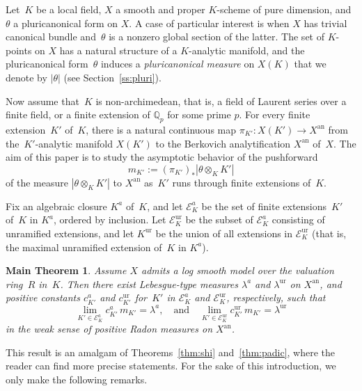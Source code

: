 \documentclass[JEP,XML,SOM,Unicode,NoFloatCountersInSection]{cedram}
\let\mathcal\mathscr
\newtheorem*{theorem*}{Main Theorem}
\theoremstyle{definition}
\numberwithin{equation}{subsection}
\newcommand{\Q}{\ensuremath{\mathbb{Q}}}
\newcommand{\an}{\mathrm{an}}
\newcommand{\ur}{\mathrm{ur}}
\let\form\theta
\let\Leb\lambda
\begin{document}
Let~$K$ be a local field, $X$ a smooth and proper $K$\nobreakdash-scheme of pure dimension, and~$\form$ a pluricanonical form on $X$. A case of particular interest is when $X$ has trivial canonical bundle and~$\form$ is a nonzero global section of the latter. The set of $K$\nobreakdash-points on $X$ has a natural structure of a $K$\nobreakdash-analytic manifold, and the pluricanonical form~$\form$ induces a
{\em pluricanonical measure} on $X(K)$ that we denote by $|\form|$ (see Section~\ref{ss:pluri}).

Now assume that~$K$ is non-archimedean, that is, a field of Laurent series over a finite field, or a finite extension of $\Q_p$ for some prime $p$. For every finite extension~$K'$ of~$K$, there is a natural continuous map
$\pi_{K'}\colon X(K')\to X^{\an}$
from the~$K'$-analytic manifold $X(K')$ to the Berkovich analytification $X^{\an}$ of~$X$. The aim of this paper is to study the asymptotic behavior of the pushforward
\begin{equation*}
m_{K'}:=(\pi_{K'})_*|\form\otimes_K K'|
\end{equation*}
of the measure $|\form\otimes_K K'|$ to $X^{\an}$ as~$K'$ runs through
finite extensions of~$K$.

Fix an algebraic closure $K^a$ of~$K$, and let $\mathcal{E}^a_K$ be the set of finite extensions~$K'$ of~$K$ in $K^a$, ordered by inclusion.
Let $\mathcal{E}^{\ur}_K$ be the subset of $\mathcal{E}^a_K$
consisting of unramified extensions,
and let $K^{\ur}$ be the union of all extensions in $\mathcal{E}^{\ur}_K$ (that is, the maximal unramified extension of~$K$ in $K^a$).

\begin{theorem*}
Assume $X$ admits a log smooth model over the valuation ring~$R$ in~$K$. Then there exist Lebesgue-type measures $\Leb^a$ and $\Leb^{\ur}$ on $X^{\an}$, and positive constants $c_{K'}^a$ and $c_{K'}^{\ur}$ for~$K'$ in $\mathcal{E}^a_K$ and $\mathcal{E}^{\ur}_K$, respectively, such that
\begin{equation*}
\lim_{K'\in\mathcal{E}^a_K}c_{K'}^a\,m_{K'}=\Leb^a,
\quad\text{and}\quad
\lim_{K'\in\mathcal{E}^{\ur}_K}c^{\ur}_{K'}\,m_{K'}=\Leb^{\ur}
\end{equation*}
in the weak sense of positive Radon measures on $X^{\an}$.
\end{theorem*}
This result is an amalgam of Theorems~\ref{thm:shi} and~\ref{thm:padic}, where the reader can find more precise statements. For the sake of this introduction, we only make the following remarks.
\end{document}
